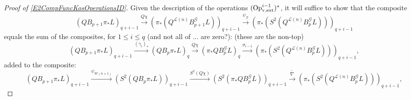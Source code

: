 \documentclass[11pt]{amsart}
\theoremstyle{plain}
\theoremstyle{definition}
\renewcommand{\to}{\longrightarrow}
\newcommand{\scrG}{\mathscr{G}}
\newcommand{\calW}{\mathcal{W}}
\newcommand{\calL}{\mathcal{L}}
\theoremstyle{plain}
\newcommand{\BSW}{{\scrG}}
\newcommand{\BSWres}{B^\BSW}%
\newcommand{\vExtCohOp}{\textup{Op}_\textup{v,ext}}
\begin{document}
\begin{Composite functor spectral sequences}
\begin{tricky proofs of operation compatibilities}
\begin{proof}[Proof of \ref{E2CompFuncKosOperationsID}]
Given the description of the operations $(\vExtCohOp^{i-1})^*$, it will suffice to show that the composite
\[(QB_{p+1}\pi_*L)_{q+i-1}\overset{Q\chi}{\to}(\pi_*(Q^{\calL(n)}\BSWres_{p+1}L))_{q+i-1}\overset{\psi_{\BSW}}{\to}(\pi_*(S^2(Q^{\calL(n)}\BSWres_pL)))_{q+i-1}\]
equals the sum of the composites, for $1\leq i \leq q$ (and not all of ... are zero?): (these are the non-top)
\[(QB_{p+1}\pi_* L)_{q+i-1}\overset{(\gamma_i)_*}{\to} (QB_{p}\pi_* L)_q\overset{Q\chi}{\to} (\pi_*Q\BSWres_{p}L)_q\overset{\sigma_{i-1}}{\to} (\pi_*(S^2(Q^{\calL(n)}\BSWres_{p}L)))_{q+i-1},\]
added to the composite:
\[(QB_{p+1}\pi_* L)_{q+i-1}\overset{\psi_{\calW(n+1)}}{\to}(S^2(QB_{p}\pi_* L))_{q+i-1}\overset{S^2(Q\chi)}{\to}
(S^2(\pi_*Q\BSWres_pL))_{q+i-1}\overset{\widetilde{\nabla}}{\to}
(\pi_*(S^2(Q^{\calL(n)}\BSWres_{p}L)))_{q+i-1},\]



\end{proof}
\end{tricky proofs of operation compatibilities}
\end{Composite functor spectral sequences}
\end{document}
